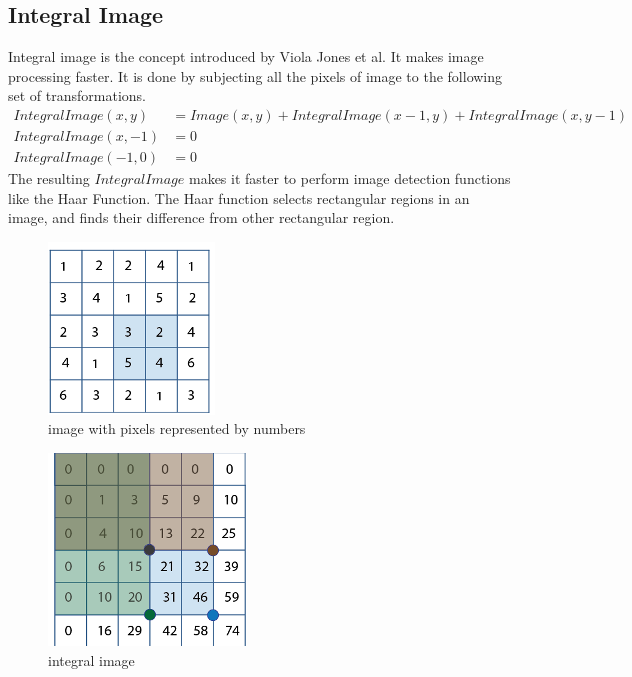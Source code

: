 \subsection{Integral Image}
Integral image is the concept introduced by Viola Jones et al. It makes image processing faster. It is done by subjecting all the pixels of image to the following set of transformations.
\begin{align*}
    IntegralImage(x,y) &=Image(x,y)+IntegralImage(x-1,y)+IntegralImage(x,y-1)\\
    IntegralImage(x,-1) &=0\\
    IntegralImage(-1,0) &=0\
\end{align*}
The resulting $IntegralImage$ makes it faster to perform image detection functions like the Haar Function. The Haar function selects rectangular regions in an image, and finds their difference from other rectangular region.
\begin{figure}[ht]
\centering
\includegraphics[scale=0.7]{image}
\caption{image with pixels represented by numbers}
\end{figure}

\begin{figure}[ht]
\centering
\includegraphics[scale=0.7]{iimage}
\caption{integral image}
\end{figure}


